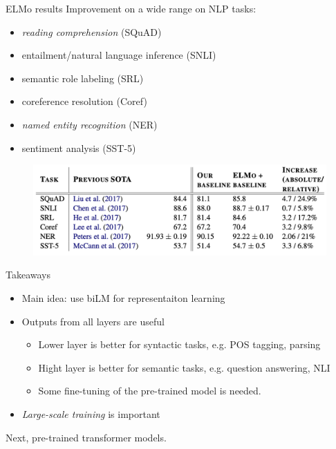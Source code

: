 \documentclass[usenames,dvipsnames,11pt,aspectratio=169]{beamer}
\begin{document}
\begin{frame}
    {ELMo results}
    Improvement on a wide range on NLP tasks:\\
    \begin{itemize}
        \item \emph{reading comprehension} (SQuAD)
        \item entailment/natural language inference (SNLI)
        \item semantic role labeling (SRL)
        \item coreference resolution (Coref) 
        \item \emph{named entity recognition} (NER) 
        \item sentiment analysis (SST-5)
    \end{itemize}
    \vspace{-2em}
    \begin{figure}
        \includegraphics[width=.9\textwidth]{figures/elmo-res}
    \end{figure}
\end{frame}

\begin{frame}
    {Takeaways}
    \begin{itemize}
        \item Main idea: use biLM for representaiton learning
        \item Outputs from all layers are useful
            \begin{itemize}
                \item Lower layer is better for syntactic tasks, e.g. POS tagging, parsing
                \item Hight layer is better for semantic tasks, e.g. question answering, NLI
                \item Some fine-tuning of the pre-trained model is needed.
            \end{itemize}
        \item \emph{Large-scale training} is important
    \end{itemize}
    Next, pre-trained transformer models.
\end{frame}
\end{document}
